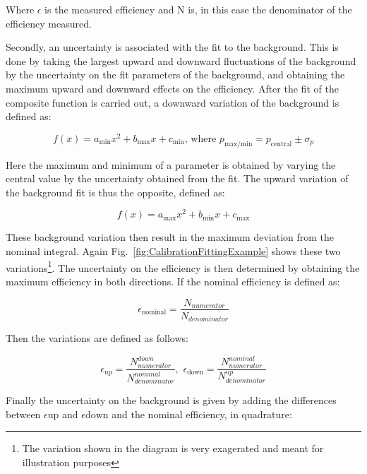 Where $\epsilon$ is the measured efficiency and N is, in this case the denominator of the efficiency measured.

Secondly, an uncertainty is associated with the fit to the background. This is done by taking the largest upward and downward fluctuations of the background by the uncertainty on the fit parameters of the background, and obtaining the maximum upward and downward effects on the efficiency. 
After the fit of the composite function is carried out, a downward variation of the background is defined as:

\begin{equation}
  f(x) = a_{\text{min}}x^{2} + b_{\text{max}}x + c_{\text{min}}\text{, where }p_{\text{max/min}}=p_{\text{central}}\pm\sigma_{p}
\end{equation}

Here the maximum and minimum of a parameter is obtained by varying the central value by the uncertainty obtained from the fit. The upward variation of the background fit is thus the opposite, defined as:

\begin{equation}
  f(x) = a_{\text{max}}x^{2} + b_{\text{min}}x + c_{\text{max}}
\end{equation}

These background variation then result in the maximum deviation from the nominal integral. Again Fig.~\ref{fig:CalibrationFittingExample} shows these two variations\footnote{The variation shown in the diagram is very exagerated and meant for illustration purposes}. The uncertainty on the efficiency is then determined by obtaining the maximum efficiency in both directions. If the nominal efficiency is defined as:

\begin{equation}
  \epsilon_{\text{nominal}} = \frac{N_{numerator}}{N_{denominator}}
\end{equation}

Then the variations are defined as follows:

\begin{equation}
  \epsilon_{\text{up}} = \frac{N^{down}_{numerator}}{N^{nominal}_{denominator}}\text{, }\,
  \epsilon_{\text{down}} = \frac{N^{nominal}_{numerator}}{N^{up}_{denominator}}
\end{equation}

Finally the uncertainty on the background is given by adding the differences between $\epsilon{\text{up}}$ and $\epsilon{\text{down}}$ and the nominal efficiency, in quadrature:

